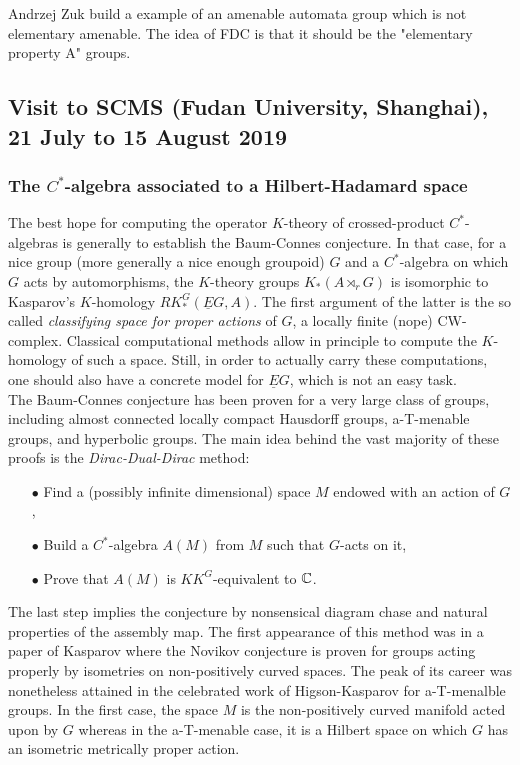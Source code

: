Andrzej Zuk build a example of an amenable automata group which is not elementary amenable. The idea of FDC is that it should be the "elementary property A" groups.

\newpage
\subsection{Visit to SCMS (Fudan University, Shanghai), 21 July to 15 August 2019}

\subsubsection*{The $C^*$-algebra associated to a Hilbert-Hadamard space}

The best hope for computing the operator $K$-theory of crossed-product $C^*$-algebras is generally to establish the Baum-Connes conjecture. In that case, for a nice group (more generally a nice enough groupoid) $G$ and a $C^*$-algebra on which $G$ acts by automorphisms, the $K$-theory groups $K_*(A\rtimes_r G)$ is isomorphic to Kasparov's $K$-homology $RK_*^G(\underline E G, A)$. The first argument of the latter is the so called \textit{classifying space for proper actions} of $G$, a locally finite (nope) CW-complex. Classical computational methods allow in principle to compute the $K$-homology of such a space.  Still, in order to actually carry these computations, one should also have a concrete model for $\underline EG$, which is not an easy task.\\

The Baum-Connes conjecture has been proven for a very large class of groups, including almost connected locally compact Hausdorff groups, a-T-menable groups, and hyperbolic groups. The main idea behind the vast majority of these proofs is the \textit{Dirac-Dual-Dirac} method:
\begin{itemize}
\item[$\bullet$] Find a (possibly infinite dimensional) space $M$ endowed with an action of $G$,
\item[$\bullet$] Build a $C^*$-algebra $A(M)$ from $M$ such that $G$-acts on it,
\item[$\bullet$] Prove that $A(M)$ is $KK^G$-equivalent to $\mathbb C$.
\end{itemize}

The last step implies the conjecture by nonsensical diagram chase and natural properties of the assembly map. The first appearance of this method was in a paper of Kasparov where the Novikov conjecture is proven for groups acting properly by isometries on non-positively curved spaces. The peak of its career was nonetheless attained in the celebrated work of Higson-Kasparov for a-T-menalble groups. In the first case, the space $M$ is the non-positively curved manifold acted upon by $G$ whereas in the a-T-menable case, it is a Hilbert space on which $G$ has an isometric metrically proper action.\\

